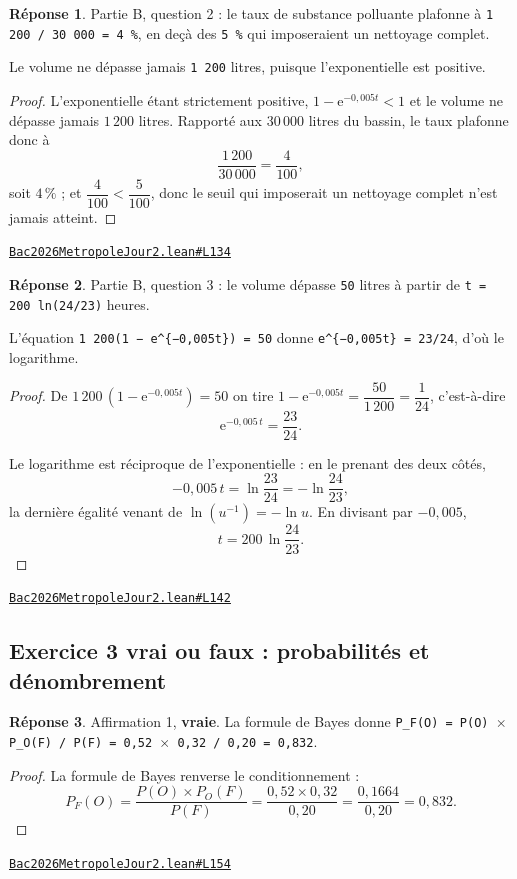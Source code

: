 \documentclass[11pt,a4paper]{article}
\theoremstyle{definition}
\theoremstyle{plain}
\theoremstyle{definition}
\newtheorem*{reponse}{Réponse}
\newcommand{\source}[2]{\par\smallskip\noindent\hfill{\footnotesize\href{#1}{\texttt{#2}}}\par\smallskip}
\begin{document}
\begin{reponse}
Partie B, question 2 : le taux de substance polluante plafonne à
\texttt{1 200 / 30 000 = 4 \%}, en deçà des \texttt{5 \%} qui imposeraient un nettoyage complet.

Le volume ne dépasse jamais \texttt{1 200} litres, puisque l'exponentielle est positive.
\end{reponse}
\begin{proof}
L'exponentielle étant strictement positive, $1 - \mathrm{e}^{-0{,}005t} < 1$ et le volume
ne dépasse jamais $1\,200$ litres. Rapporté aux $30\,000$ litres du bassin, le taux
plafonne donc à
\[ \frac{1\,200}{30\,000} = \frac{4}{100} , \]
soit $4\,\%$ ; et $\dfrac{4}{100} < \dfrac{5}{100}$, donc le seuil qui imposerait un
nettoyage complet n'est jamais atteint.
\end{proof}
\source{https://github.com/Commutator-IO/learn-lean/blob/main/exams/2026/Bac2026MetropoleJour2.lean\#L134}{Bac2026MetropoleJour2.lean\#L134}

\begin{reponse}
Partie B, question 3 : le volume dépasse \texttt{50} litres à partir de
\texttt{t = 200 ln(24/23)} heures.

L'équation \texttt{1 200(1 − e\textasciicircum{}\{−0,005t\}) = 50} donne \texttt{e\textasciicircum{}\{−0,005t\} = 23/24}, d'où le
logarithme.
\end{reponse}
\begin{proof}
De $1\,200\,(1 - \mathrm{e}^{-0{,}005t}) = 50$ on tire $1 - \mathrm{e}^{-0{,}005t} =
\dfrac{50}{1\,200} = \dfrac{1}{24}$, c'est-à-dire
\[ \mathrm{e}^{-0{,}005\,t} = \frac{23}{24} . \]

Le logarithme est réciproque de l'exponentielle : en le prenant des deux côtés,
\[ -0{,}005\,t = \ln\frac{23}{24} = -\ln\frac{24}{23} , \]
la dernière égalité venant de $\ln\left(u^{-1}\right) = -\ln u$. En divisant par
$-0{,}005$,
\[ t = 200\,\ln\frac{24}{23} . \]
\end{proof}
\source{https://github.com/Commutator-IO/learn-lean/blob/main/exams/2026/Bac2026MetropoleJour2.lean\#L142}{Bac2026MetropoleJour2.lean\#L142}

\subsection{Exercice 3 \textemdash{} vrai ou faux : probabilités et dénombrement}

\begin{reponse}
Affirmation 1, \textbf{vraie}. La formule de Bayes donne
\texttt{P\_F(O) = P(O) \(\times\) P\_O(F) / P(F) = 0,52 \(\times\) 0,32 / 0,20 = 0,832}.
\end{reponse}
\begin{proof}
La formule de Bayes renverse le conditionnement :
\[ P_F(O) = \frac{P(O) \times P_O(F)}{P(F)}
   = \frac{0{,}52 \times 0{,}32}{0{,}20} = \frac{0{,}1664}{0{,}20} = 0{,}832 . \]
\end{proof}
\source{https://github.com/Commutator-IO/learn-lean/blob/main/exams/2026/Bac2026MetropoleJour2.lean\#L154}{Bac2026MetropoleJour2.lean\#L154}
\end{document}
